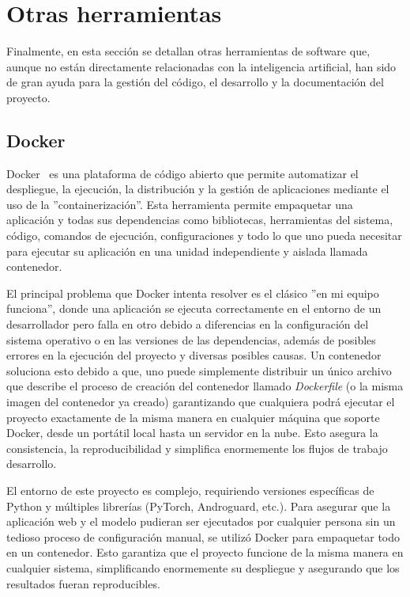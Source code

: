 \section{Otras herramientas}

Finalmente, en esta sección se detallan otras herramientas de software que, aunque no están directamente relacionadas con la inteligencia artificial, han sido de gran ayuda para la gestión del código, el desarrollo y la documentación del proyecto.

\subsection{Docker}


Docker~\cite{dockerDocs} es una plataforma de código abierto que permite automatizar el despliegue, la ejecución, la distribución y la gestión de aplicaciones mediante el uso de la ''containerización''. Esta herramienta permite empaquetar una aplicación y todas sus dependencias como bibliotecas, herramientas del sistema, código, comandos de ejecución, configuraciones y todo lo que uno pueda necesitar para ejecutar su aplicación en una unidad independiente y aislada llamada contenedor.

El principal problema que Docker intenta resolver es el clásico ''en mi equipo funciona'', donde una aplicación se ejecuta correctamente en el entorno de un desarrollador pero falla en otro debido a diferencias en la configuración del sistema operativo o en las versiones de las dependencias, además de posibles errores en la ejecución del proyecto y diversas posibles causas. Un contenedor soluciona esto debido a que, uno puede simplemente distribuir un único archivo que describe el proceso de creación del contenedor llamado \textit{Dockerfile} (o la misma imagen del contenedor ya creado) garantizando que cualquiera podrá ejecutar el proyecto exactamente de la misma manera en cualquier máquina que soporte Docker, desde un portátil local hasta un servidor en la nube. Esto asegura la consistencia, la reproducibilidad y simplifica enormemente los flujos de trabajo desarrollo.

El entorno de este proyecto es complejo, requiriendo versiones específicas de Python y múltiples librerías (PyTorch, Androguard, etc.). Para asegurar que la aplicación web y el modelo pudieran ser ejecutados por cualquier persona sin un tedioso proceso de configuración manual, se utilizó Docker para empaquetar todo en un contenedor. Esto garantiza que el proyecto funcione de la misma manera en cualquier sistema, simplificando enormemente su despliegue y asegurando que los resultados fueran reproducibles.

